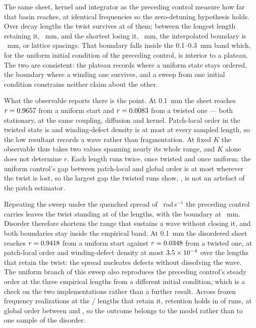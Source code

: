 \documentclass{article}
\begin{document}
The same sheet, kernel and integrator as the preceding control measure how far that basin reaches, at identical frequencies so the zero-detuning hypothesis holds. Over \waveSampleCount{} decay lengths the twist survives at \waveRetainedCount{} of them; between the longest length retaining it, \waveRetainedMax~mm, and the shortest losing it, \waveLostMin~mm, the interpolated boundary is \waveBoundary~mm, or \waveBoundaryCells{} lattice spacings. That boundary falls inside the 0.1--0.3~mm band which, for the uniform initial condition of the preceding control, is interior to a plateau. The two are consistent: the plateau records where a uniform state stays ordered, the boundary where a winding one survives, and a sweep from one initial condition constrains neither claim about the other.

What the observable reports there is the point. At 0.1~mm the sheet reaches $r=0.9657$ from a uniform start and $r=0.0083$ from a twisted one --- both stationary, at the same coupling, diffusion and kernel. Patch-local order in the twisted state is \waveBandLocalOrder{} and winding-defect density is at most \waveDefectMaximum{} at every sampled length, so the low resultant records a wave rather than fragmentation. At fixed $K$ the observable thus takes two values spanning nearly its whole range, and $K$ alone does not determine $r$. Each length runs twice, once twisted and once uniform; the uniform control's gap between patch-local and global order is at most \waveControlGapMax{} wherever the twist is lost, so the largest gap the twisted runs show, \waveGapMax, is not an artefact of the patch estimator.

Repeating the sweep under the quenched spread of \waveSpread~rad\,s$^{-1}$ the preceding control carries leaves the twist standing at \waveSpreadRetainedCount{} of the \waveSampleCount{} lengths, with the boundary at \waveSpreadBoundary~mm. Disorder therefore shortens the range that sustains a wave without closing it, and both boundaries stay inside the empirical band. At 0.1~mm the disordered sheet reaches $r=0.9418$ from a uniform start against $r=0.0348$ from a twisted one, at patch-local order \waveSpreadBandLocalOrder{} and winding-defect density at most $3.5\times10^{-4}$ over the lengths that retain the twist: the spread nucleates defects without dissolving the wave. The uniform branch of this sweep also reproduces the preceding control's steady order at the three empirical lengths from a different initial condition, which is a check on the two implementations rather than a further result. Across \waveSeedCount{} frozen frequency realizations at the \waveSeedTotal/\waveSeedCount{} lengths that retain it, retention holds in \waveSeedRetained{} of \waveSeedTotal{} runs, at global order between \waveSeedOrderMin{} and \waveSeedOrderMax, so the outcome belongs to the model rather than to one sample of the disorder.
\end{document}
